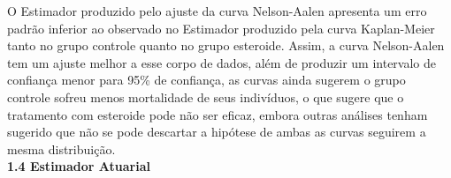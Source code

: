 \documentclass[12pt,a4paper]{article}
\begin{document}
	\vspace{1cm}
	O Estimador produzido pelo ajuste da curva Nelson-Aalen apresenta um erro padrão inferior ao observado no Estimador produzido pela curva Kaplan-Meier tanto no grupo controle quanto no grupo esteroide. Assim, a curva Nelson-Aalen tem um ajuste melhor a esse corpo de dados, além de produzir um intervalo de confiança menor para 95\% de confiança, as curvas ainda sugerem o grupo controle sofreu menos mortalidade de seus indivíduos, o que sugere que o tratamento com esteroide pode não ser eficaz, embora outras análises tenham sugerido que não se pode descartar a hipótese de ambas as curvas seguirem a mesma distribuição.
	\vspace{1cm}\\
	\textbf{1.4 Estimador Atuarial}
	\vspace{0.5cm}\\
\end{document}
